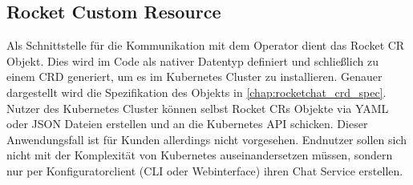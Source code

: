 \subsection{Rocket Custom Resource}
Als Schnittstelle für die Kommunikation mit dem Operator dient das Rocket \ac{CR} Objekt.
Dies wird im Code als nativer Datentyp definiert und schließlich zu einem \ac{CRD} generiert, um es im Kubernetes Cluster zu installieren.
Genauer dargestellt wird die Spezifikation des Objekts in \ref{chap:rocketchat_crd_spec}.
Nutzer des Kubernetes Cluster können selbst Rocket \acp{CR} Objekte via YAML oder JSON Dateien erstellen und
an die Kubernetes API schicken. Dieser Anwendungsfall ist für Kunden allerdings nicht vorgesehen.
Endnutzer sollen sich nicht mit der Komplexität von Kubernetes auseinandersetzen müssen,
sondern nur per Konfiguratorclient (\ac{CLI} oder Webinterface) ihren Chat Service erstellen.


